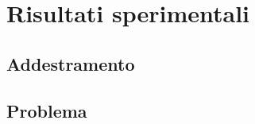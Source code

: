 \chapter{Risultati sperimentali} %
\label{chap:Risultati sperimentali}

\section{Addestramento} %
\label{sec:Addestramento}


\section{Problema} %
\label{sec:Problema}







